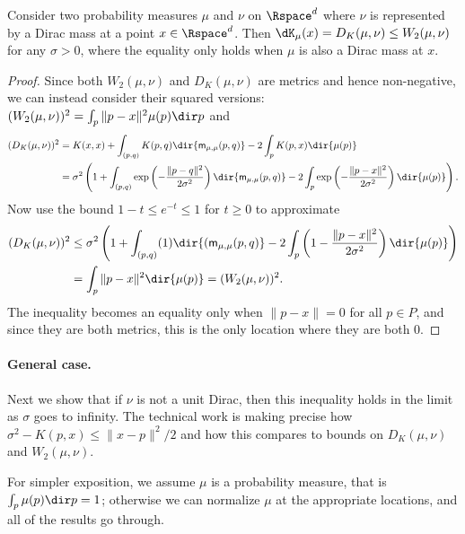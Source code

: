 \documentclass[11pt]{myclass}
\begin{document}
\begin{lemma}
Consider two probability measures $\mu$ and $\nu$ on $\Rspace^d$ where $\nu$ is represented by a Dirac mass at a point $x \in \Rspace^d$.  
Then $\dK_\mu(x) = D_K(\mu,\nu) \leq W_2(\mu,\nu)$ for any $\sigma >0$, where the equality only holds when $\mu$ is also a Dirac mass at $x$.
\label{lem:2pts}
\end{lemma}
\begin{proof}
Since both $W_2(\mu,\nu)$ and $D_K(\mu,\nu)$ are metrics and hence non-negative, we can instead consider their squared versions: $(W_2(\mu,\nu))^2 = \int_p \|p-x\|^2 \mu(p) \dir p$ and 
\vspace{-2mm}
\begin{align*}
(D_K(\mu,\nu))^2 
&= 
K(x,x) + \int_{(p,q)} K(p,q) \dir{\textsf{m}_{\mu,\mu}(p,q)} - 2 \int_{p} K(p,x) \dir{\mu(p)}
\\ &= 
\sigma^2 \left(1 + \int_{(p,q)} \exp \left(-\frac{\|p-q\|^2}{2 \sigma^2} \right) \dir{\textsf{m}_{\mu,\mu}(p,q)} - 2 \int_p \exp \left( - \frac{\|p-x\|^2}{2 \sigma^2} \right) \dir{\mu(p)} \right).
\end{align*}
Now use the bound $1-t \leq e^{-t} \leq 1$ for $t \geq 0$ to approximate 
\begin{align*}
(D_K(\mu,\nu))^2 
& \leq
\sigma^2 \left(1 + \int_{(p,q)} (1) \dir{(\textsf{m}_{\mu,\mu}(p,q)} - 2 \int_p \left(1-\frac{\|p-x\|^2}{2 \sigma^2} \right) \dir{\mu(p)} \right)
\\ & =
\int_p \|p-x\|^2 \dir{\mu(p)} = (W_2(\mu,\nu))^2. 
\end{align*}
The inequality becomes an equality only when $\|p-x\| = 0$ for all $p \in P$, and since they are both metrics, this is the only location where they are both $0$.  
\end{proof}


\paragraph{General case.}
Next we show that if $\nu$ is not a unit Dirac, then this inequality holds in the limit as $\sigma$ goes to infinity.  The technical work is making precise how $\sigma^2 - K(p,x) \leq \|x-p\|^2/2$ and how this compares to bounds on $D_K(\mu,\nu)$ and $W_2(\mu,\nu)$.  

For simpler exposition, we assume $\mu$ is a probability measure, that is $\int_p \mu(p) \dir p = 1$; otherwise we can normalize $\mu$ at the appropriate locations, and all of the results go through.  
\end{document}

